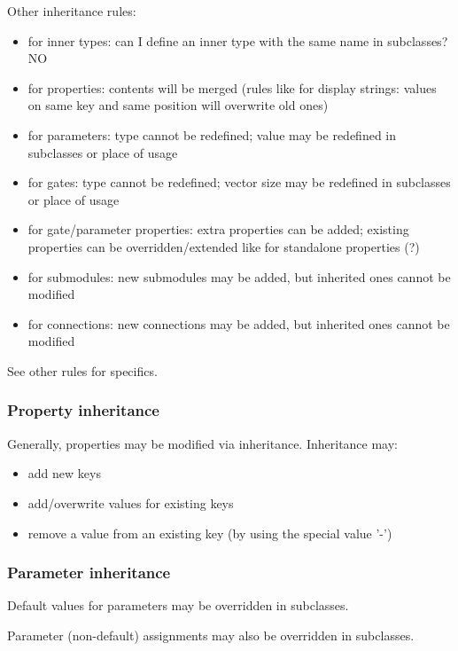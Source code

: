 Other inheritance rules:
\begin{itemize}
    \item  for inner types:
       can I define an inner type with the same name in subclasses? NO
    \item  for properties:
       contents will be merged (rules like for display strings: values on
       same key and same position will overwrite old ones)
    \item for parameters:
       type cannot be redefined;
       value may be redefined in subclasses or place of usage
    \item  for gates:
       type cannot be redefined;
       vector size may be redefined in subclasses or place of usage
    \item  for gate/parameter properties:
       extra properties can be added;
       existing properties can be overridden/extended like for standalone properties (?)
    \item  for submodules:
       new submodules may be added, but inherited ones cannot be modified
    \item  for connections:
       new connections may be added, but inherited ones cannot be modified
\end{itemize}

See other rules for specifics.

\subsubsection{Property inheritance}

Generally, properties may be modified via inheritance. Inheritance may:

\begin{itemize}
    \item add new keys
    \item add/overwrite values for existing keys
    \item remove a value from an existing key (by using the special value '-')
\end{itemize}


\subsubsection{Parameter inheritance}

Default values for parameters may be overridden in subclasses.

Parameter (non-default) assignments may also be overridden in subclasses.

